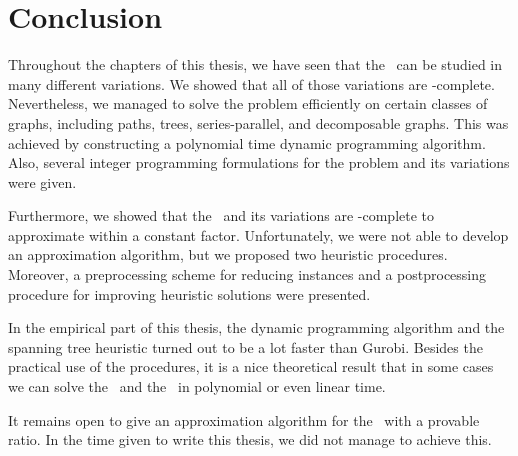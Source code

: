 \section{Conclusion}
\label{sec:conclusion}

Throughout the chapters of this thesis, we have seen that the \WSP\ can be studied in many different variations. We showed that all of those variations are \NP-complete. Nevertheless, we managed to solve the problem efficiently on certain classes of graphs, including paths, trees, series-parallel, and decomposable graphs. This was achieved by constructing a polynomial time dynamic programming algorithm. Also, several integer programming formulations for the problem and its variations were given.\medskip

Furthermore, we showed that the \WSP\ and its variations are \NP-complete to approximate within a constant factor. Unfortunately, we were not able to develop an approximation algorithm, but we proposed two heuristic procedures.  Moreover, a preprocessing scheme for reducing instances and a postprocessing procedure for improving heuristic solutions were presented.\medskip

In the empirical part of this thesis, the dynamic programming algorithm and the spanning tree heuristic turned out to be a lot faster than Gurobi. Besides the practical use of the procedures, it is a nice theoretical result that in some cases we can solve the \WSP\ and the \WISP\ in polynomial or even linear time.\medskip

It remains open to give an approximation algorithm for the \WSP\ with a provable ratio. In the time given to write this thesis, we did not manage to achieve this.
